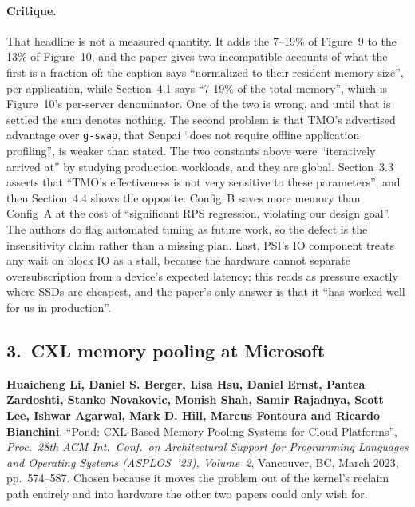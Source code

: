 \paragraph{Critique.}
That headline is not a measured quantity. It adds the 7--19\% of Figure~9 to the 13\% of
Figure~10, and the paper gives two incompatible accounts of what the first is a fraction
of: the caption says ``normalized to their resident memory size'', per application, while
Section~4.1 says ``7-19\% of the total memory'', which is Figure~10's per-server
denominator. One of the two is wrong, and until that is settled the sum denotes nothing.
The second problem is that TMO's advertised
advantage over \texttt{g-swap}, that Senpai ``does not require offline application
profiling'', is weaker than stated. The two constants above were ``iteratively arrived
at'' by studying production workloads, and they are global. Section~3.3 asserts that
``TMO's effectiveness is not very sensitive to these parameters'', and then Section~4.4
shows the opposite: Config~B saves more memory than Config~A at the cost of
``significant RPS regression, violating our design goal''. The authors do flag automated
tuning as future work, so the defect is the insensitivity claim rather than a missing
plan. Last, PSI's IO component treats any wait on block IO as a stall, because the
hardware cannot separate oversubscription from a device's expected latency; this reads as
pressure exactly where SSDs are cheapest, and the paper's only answer is that it ``has
worked well for us in production''.

\subsection*{3.~CXL memory pooling at Microsoft}

\noindent\textbf{Huaicheng Li, Daniel S. Berger, Lisa Hsu, Daniel Ernst, Pantea
Zardoshti, Stanko Novakovic, Monish Shah, Samir Rajadnya, Scott Lee, Ishwar Agarwal,
Mark D. Hill, Marcus Fontoura and Ricardo Bianchini}, ``Pond: CXL-Based Memory Pooling
Systems for Cloud Platforms'', \emph{Proc.\ 28th ACM Int.\ Conf.\ on Architectural
Support for Programming Languages and Operating Systems (ASPLOS~'23), Volume~2},
Vancouver, BC, March 2023, pp.~574--587. Chosen because it moves the problem out of the
kernel's reclaim path entirely and into hardware the other two papers could only wish
for.

